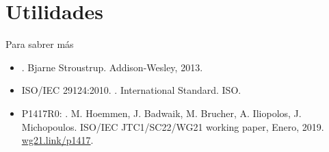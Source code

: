 \section{Utilidades}





%

\begin{frame}[t]{Para sabrer más}
\begin{itemize}
  \item {}.
        Bjarne Stroustrup.
        Addison-Wesley, 2013.

  \vfill
  \item ISO/IEC 29124:2010.
        .
        International Standard. 
        ISO.

  \vfill
  \item P1417R0: .
        M. Hoemmen, J. Badwaik, M. Brucher, A. Iliopolos, J. Michopoulos.
        ISO/IEC JTC1/SC22/WG21 working paper, Enero, 2019.
        \url{wg21.link/p1417}.
        
        
\end{itemize}
\end{frame}

